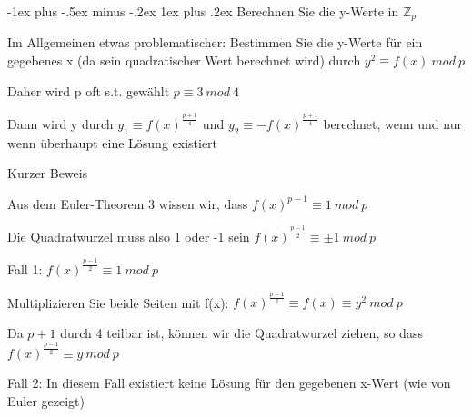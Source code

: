 \documentclass[a4paper]{article}
\makeatletter
\renewcommand{\subsubsection}{\@startsection{subsubsection}{3}{0mm}%
 {-1ex plus -.5ex minus -.2ex}%
 {1ex plus .2ex}%
 {\normalfont\small\bfseries}}
\makeatother
\begin{document}
\begin{multicols}{3}
      \subsubsection{Berechnen Sie die y-Werte in $\mathbb{Z}_p$}
      \begin{itemize*}
            \item Im Allgemeinen etwas problematischer: Bestimmen Sie die y-Werte für ein gegebenes x (da sein quadratischer Wert berechnet wird) durch $y^2\equiv f(x)\ mod\ p$
            \item Daher wird p oft s.t. gewählt $p\equiv 3\ mod\ 4$
            \item Dann wird y durch $y_1\equiv f(x)^{\frac{p+1}{4}}$ und $y_2\equiv -f(x)^{\frac{p+1}{4}}$ berechnet, wenn und nur wenn überhaupt eine Lösung existiert
            \item Kurzer Beweis
            \begin{itemize*}
                  \item Aus dem Euler-Theorem 3 wissen wir, dass $f(x)^{p-1}\equiv 1\ mod\ p$
                  \item Die Quadratwurzel muss also 1 oder -1 sein $f(x)^{\frac{p-1}{2}}\equiv\pm 1\ mod\ p$
            \end{itemize*}
            \item Fall 1: $f(x)^{\frac{p-1}{2}}\equiv1\ mod\ p$
            \begin{itemize*}
                  \item Multiplizieren Sie beide Seiten mit f(x): $f(x)^{\frac{p-1}{2}}\equiv f(x)\equiv y^2\ mod\ p$
                  \item Da $p + 1$ durch 4 teilbar ist, können wir die Quadratwurzel ziehen, so dass $f(x)^{\frac{p-1}{2}}\equiv y\ mod\ p$
            \end{itemize*}
            \item Fall 2: In diesem Fall existiert keine Lösung für den gegebenen x-Wert (wie von Euler gezeigt)
      \end{itemize*}


\end{multicols}
\end{document}
